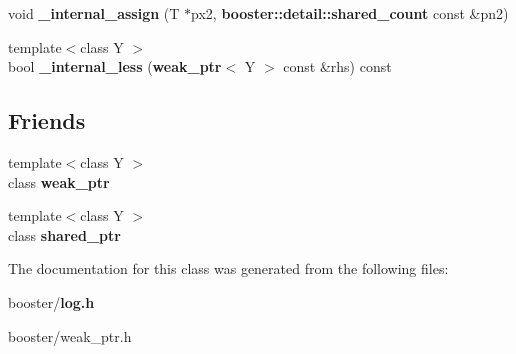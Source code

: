 \begin{DoxyCompactItemize}
\item 
void {\bfseries \+\_\+internal\+\_\+assign} (T $\ast$px2, {\bf booster\+::detail\+::shared\+\_\+count} const \&pn2)\label{classbooster_1_1weak__ptr_a25735d2007d3d902fecbbc62baa5f68d}

\item 
{\footnotesize template$<$class Y $>$ }\\bool {\bfseries \+\_\+internal\+\_\+less} ({\bf weak\+\_\+ptr}$<$ Y $>$ const \&rhs) const \label{classbooster_1_1weak__ptr_add37bcc06d008e84a977813a11932249}

\end{DoxyCompactItemize}
\subsection*{Friends}
\begin{DoxyCompactItemize}
\item 
{\footnotesize template$<$class Y $>$ }\\class {\bfseries weak\+\_\+ptr}\label{classbooster_1_1weak__ptr_a27df6e2a1650d985bdeda33f0303c83f}

\item 
{\footnotesize template$<$class Y $>$ }\\class {\bfseries shared\+\_\+ptr}\label{classbooster_1_1weak__ptr_ab2104fa6e839672da3c30400e8325e52}

\end{DoxyCompactItemize}


The documentation for this class was generated from the following files\+:\begin{DoxyCompactItemize}
\item 
booster/{\bf log.\+h}\item 
booster/weak\+\_\+ptr.\+h\end{DoxyCompactItemize}
